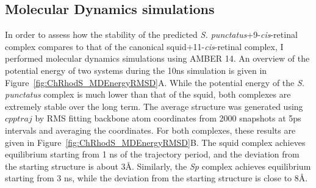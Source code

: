 \subsection*{Molecular Dynamics simulations}
In order to assess how the stability of the predicted \textit{S. punctatus}+9-\textit{cis}-retinal complex compares to that of the canonical squid+11-\textit{cis}-retinal complex, I performed molecular dynamics simulations using AMBER 14. An overview of the potential energy of two systems during the 10ns simulation is given in Figure~\ref{fig:ChRhodS_MDEnergyRMSD}A. While the potential energy of the \textit{S. punctatus} complex is much lower than that of the squid, both complexes are extremely stable over the long term. The average structure was generated using $cpptraj$ by RMS fitting backbone atom coordinates from 2000 snapshots at 5ps intervals and averaging the coordinates. For both complexes, these results are given in Figure~\ref{fig:ChRhodS_MDEnergyRMSD}B. The squid complex achieves equilibrium starting from 1 ns of the trajectory period, and the deviation from the starting structure is about 3\AA. Similarly, the \textit{Sp} complex achieves equilibrium starting from 3 ns, while the deviation from the starting structure is close to 8\AA. \\

